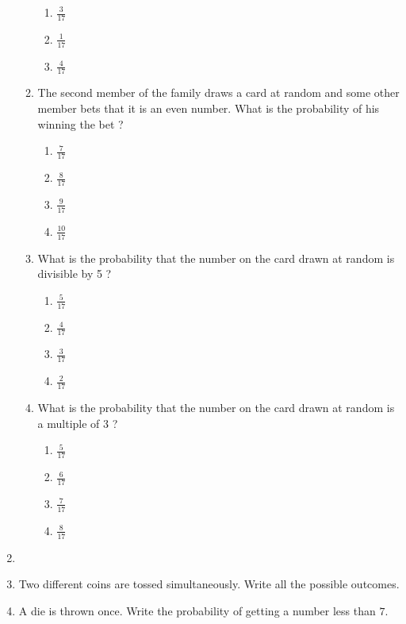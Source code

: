\begin{enumerate}
\begin{enumerate}
\begin{enumerate}
        \item $\frac{3}{17}$
        \item $\frac{1}{17}$
        \item $\frac{4}{17}$
\end{enumerate}
       \item The second member of the family draws a card at random and some other
member bets that it is an even number. What is the probability of his winning
the bet ?
\begin{enumerate}
        \item $\frac{7}{17}$
        \item $\frac{8}{17}$
        \item $\frac{9}{17}$
        \item $\frac{10}{17}$
\end{enumerate}
      \item What is the probability that the number on the card drawn at random is
divisible by 5 ?
\begin{enumerate}
        \item $\frac{5}{17}$
        \item $\frac{4}{17}$
        \item $\frac{3}{17}$
        \item $\frac{2}{17}$
\end{enumerate}
      \item What is the probability that the number on the card drawn at random is a
multiple of 3 ?
\begin{enumerate}
        \item $\frac{5}{17}$
        \item $\frac{6}{17}$
        \item $\frac{7}{17}$
        \item $\frac{8}{17}$
\end{enumerate}   
\end{enumerate}                                                                                                                                       
\item 
\item Two different coins are tossed simultaneously. Write all the possible outcomes.                                                                   
\item A die is thrown once. Write the probability of getting a number less than $7$.


\end{enumerate}
